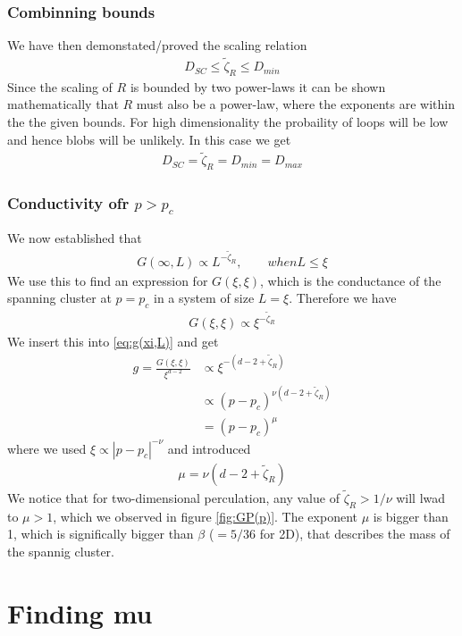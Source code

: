 \documentclass[reprint, amsmath, amssymb, aps]{revtex4-2}
\newcommand{\zetaR}{\tilde{\zeta}_R}
\begin{document}
\subsubsection{Combinning bounds}
We have then demonstated/proved the scaling relation
\begin{align*}
  D_{SC} \le \zetaR \le D_{min}
\end{align*}
Since the scaling of $R$ is bounded by two power-laws it can be shown mathematically that $R$ must also be a power-law, where the exponents are within the the given bounds. For high dimensionality the probaility of loops will be low and hence blobs will be unlikely. In this case we get
\begin{align*}
  D_{SC} = \zetaR = D_{min} = D_{max}
\end{align*}

\subsubsection{Conductivity ofr $p > p_c$}
We now established that
\begin{align*}
  G(\infty, L) \propto L^{-\zetaR}, \qquad when L \le \xi
\end{align*}
We use this to find an expression for $G(\xi, \xi)$, which is the conductance of the spanning cluster at $p = p_c$ in a system of size $L=\xi$. Therefore we have
\begin{align*}
  G(\xi, \xi) \propto \xi^{-\zetaR}
\end{align*}
We insert this into \ref{eq:g(xi,L)} and get
\begin{align*}
  g = \frac{G(\xi, \xi)}{\xi^{d-2}} &\propto \xi^{-(d-2+\zetaR)} \\
  &\propto (p-p_c)^{\nu(d-2+\zetaR)} \\
  &= (p-p_c)^{\mu}
\end{align*}
where we used $\xi \propto |p-p_c|^{-\nu}$ and introduced
\begin{align*}
  \mu = \nu(d-2+\zetaR)
\end{align*}
We notice that for two-dimensional perculation, any value of $\zetaR > 1/\nu$ will lwad to $\mu > 1$, which we observed in figure \ref{fig:GP(p)}. The exponent $\mu$ is bigger than 1, which is significally bigger than $\beta$ ($= 5/36$ for 2D), that describes the mass of the spannig cluster.

\section{Finding mu}
\end{document}
